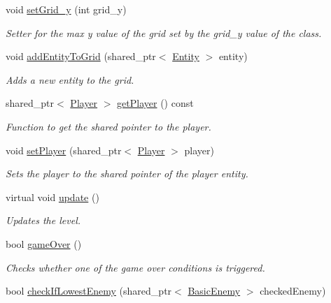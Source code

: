 \begin{DoxyCompactItemize}
void \hyperlink{classGameLogic_1_1Level_a23edca6119a73f28b7823f1d6c1df2d6}{set\+Grid\+\_\+y} (int grid\+\_\+y)
\begin{DoxyCompactList}\small\item\em Setter for the max y value of the grid set by the grid\+\_\+y value of the class. \end{DoxyCompactList}\item 
void \hyperlink{classGameLogic_1_1Level_a9945b2baf78f44ff61f189846cc59c7a}{add\+Entity\+To\+Grid} (shared\+\_\+ptr$<$ \hyperlink{classGameLogic_1_1Entity}{Entity} $>$ entity)
\begin{DoxyCompactList}\small\item\em Adds a new entity to the grid. \end{DoxyCompactList}\item 
shared\+\_\+ptr$<$ \hyperlink{classGameLogic_1_1Player}{Player} $>$ \hyperlink{classGameLogic_1_1Level_a76420d9e37505a2e5cbbbe8c4f57adbe}{get\+Player} () const
\begin{DoxyCompactList}\small\item\em Function to get the shared pointer to the player. \end{DoxyCompactList}\item 
void \hyperlink{classGameLogic_1_1Level_a418ab1b60ad2d35ad5983a0ec596dce6}{set\+Player} (shared\+\_\+ptr$<$ \hyperlink{classGameLogic_1_1Player}{Player} $>$ player)
\begin{DoxyCompactList}\small\item\em Sets the player to the shared pointer of the player entity. \end{DoxyCompactList}\item 
virtual void \hyperlink{classGameLogic_1_1Level_a72f5b36a0254821aabaaafa48834998b}{update} ()
\begin{DoxyCompactList}\small\item\em Updates the level. \end{DoxyCompactList}\item 
bool \hyperlink{classGameLogic_1_1Level_ab4496926ad24689d101de4a2e3702149}{game\+Over} ()
\begin{DoxyCompactList}\small\item\em Checks whether one of the game over conditions is triggered. \end{DoxyCompactList}\item 
bool \hyperlink{classGameLogic_1_1Level_a045b9a34d69596868df7c66f47d6912e}{check\+If\+Lowest\+Enemy} (shared\+\_\+ptr$<$ \hyperlink{classGameLogic_1_1BasicEnemy}{Basic\+Enemy} $>$ checked\+Enemy)

\end{DoxyCompactItemize}
